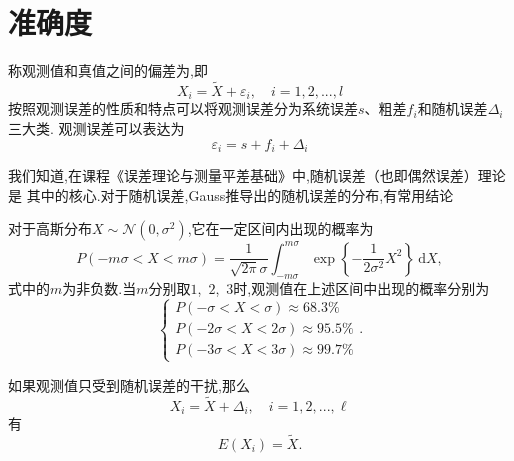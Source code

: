 \documentclass[cn,10pt,citestyle=gb7714-2015,bibstyle=gb7714-2015]{elegantbook}
\newcommand{\md}{\ \mathrm{d}}
\renewcommand{\l}{\ell}
\begin{document}
\section{准确度}
\begin{definition}[误差理论]\label{def:error-theory}
  称观测值和真值之间的偏差为,即
  \begin{equation}
    X_i=\widetilde{X}+\varepsilon_i,\quad i=1,2,...,l
  \end{equation}
  按照观测误差的性质和特点可以将观测误差分为系统误差$s$、粗差$f_i$和随机误差$\varDelta_i$三大类.
  观测误差可以表达为
  \begin{equation}
    \varepsilon_i=s+f_i+\varDelta_i
  \end{equation}
\end{definition}
我们知道,在课程《误差理论与测量平差基础》中,随机误差（也即偶然误差）理论是
其中的核心.对于随机误差,Gauss推导出的随机误差的分布,有常用结论
\begin{theorem}\label{thm:rand-error-distri}
  对于高斯分布$X\sim \mathcal{N}(0,\sigma^2)$,它在一定区间内出现的概率为
  \begin{equation}
    P(-m\sigma<X<m\sigma)=\frac{1}{\sqrt{2\pi}\sigma}\int_{-m\sigma}^{m\sigma}\exp\left\{-\frac{1}{2\sigma^2}X^2\right\}\md X,
  \end{equation}
  式中的$m$为非负数.当$m$分别取$1$,\ $2$,\ $3$时,观测值在上述区间中出现的概率分别为
  \begin{equation}
    \boxed{\begin{cases}
      P(-\sigma<X<\sigma)\approx 68.3\%\\
      P(-2\sigma<X<2\sigma)\approx 95.5\%\\
      P(-3\sigma<X<3\sigma)\approx 99.7\%
    \end{cases}}.
  \end{equation}
\end{theorem}

如果观测值只受到随机误差的干扰,那么
\[
    X_i=\widetilde{X}+\varDelta_i,\quad i=1,2,...,\l
\]
有
\[
    E(X_i)=\widetilde{X}.
\]
\end{document}
